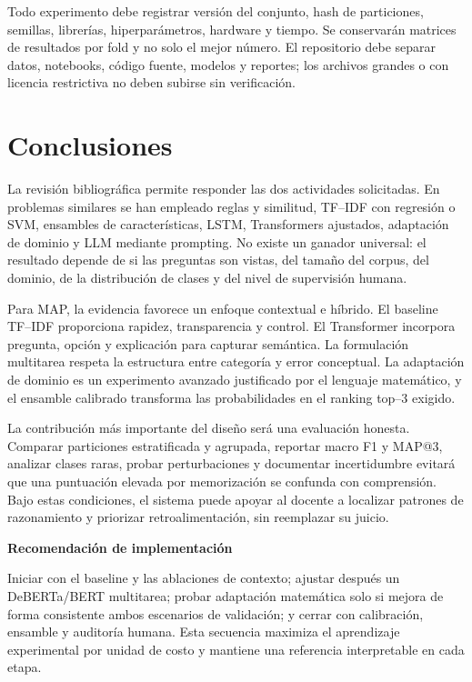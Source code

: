 \documentclass[11pt,oneside,openany]{book}
\newenvironment{decision}[1][]{%
  \begin{lrbox}{\infobox}\begin{minipage}{0.92\textwidth}
  \color{GrisTexto}\sffamily\textbf{#1}\par\smallskip\rmfamily}
  {\end{minipage}\end{lrbox}\par\medskip\noindent
   \colorbox{VerdeClaro}{\usebox{\infobox}}\par\medskip}
\begin{document}
Todo experimento debe registrar versión del conjunto, hash de particiones,
semillas, librerías, hiperparámetros, hardware y tiempo. Se conservarán matrices de
resultados por fold y no solo el mejor número. El repositorio debe separar datos,
notebooks, código fuente, modelos y reportes; los archivos grandes o con licencia
restrictiva no deben subirse sin verificación.

\chapter{Conclusiones}

La revisión bibliográfica permite responder las dos actividades solicitadas. En
problemas similares se han empleado reglas y similitud, TF--IDF con regresión o
SVM, ensambles de características, LSTM, Transformers ajustados, adaptación de
dominio y LLM mediante prompting. No existe un ganador universal: el resultado
depende de si las preguntas son vistas, del tamaño del corpus, del dominio, de la
distribución de clases y del nivel de supervisión humana.

Para MAP, la evidencia favorece un enfoque contextual e híbrido. El baseline
TF--IDF proporciona rapidez, transparencia y control. El Transformer incorpora
pregunta, opción y explicación para capturar semántica. La formulación multitarea
respeta la estructura entre categoría y error conceptual. La adaptación de
dominio es un experimento avanzado justificado por el lenguaje matemático, y el
ensamble calibrado transforma las probabilidades en el ranking top--3 exigido.

La contribución más importante del diseño será una evaluación honesta. Comparar
particiones estratificada y agrupada, reportar macro F1 y MAP@3, analizar clases
raras, probar perturbaciones y documentar incertidumbre evitará que una puntuación
elevada por memorización se confunda con comprensión. Bajo estas condiciones, el
sistema puede apoyar al docente a localizar patrones de razonamiento y priorizar
retroalimentación, sin reemplazar su juicio.

\begin{decision}[Recomendación de implementación]
Iniciar con el baseline y las ablaciones de contexto; ajustar después un
DeBERTa/BERT multitarea; probar adaptación matemática solo si mejora de forma
consistente ambos escenarios de validación; y cerrar con calibración, ensamble y
auditoría humana. Esta secuencia
maximiza el aprendizaje experimental por unidad de costo y mantiene una referencia
interpretable en cada etapa.
\end{decision}
\end{document}
